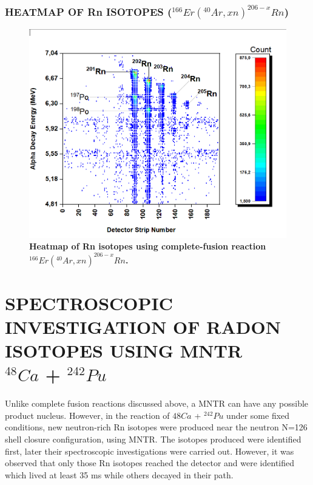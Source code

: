 \documentclass[12pt]{article}
\begin{document}
\subsubsection{HEATMAP OF Rn ISOTOPES ($^{166}Er(^{40}Ar,xn)^{206-x}Rn$)}
\begin{figure}[h]
\centering
\includegraphics[scale=0.5]{Heatmap_Rn(201-205).png}
\caption{\textbf{Heatmap of Rn isotopes using complete-fusion reaction $^{166}Er(^{40}Ar,xn)^{206-x}Rn$.}}
\label{Heatmap of Rn(201-205) isotopes.}
\end{figure}

\section{SPECTROSCOPIC INVESTIGATION OF RADON ISOTOPES USING MNTR\\ $^{48}Ca$ + $^{242}Pu$}
Unlike complete fusion reactions discussed above, a MNTR can have any possible product nucleus. However, in the reaction of ${48}Ca$ + $^{242}Pu$ under some fixed conditions, new neutron-rich Rn isotopes were produced near the neutron N=126 shell closure configuration, using MNTR. The isotopes produced were identified first, later their spectroscopic investigations were carried out. However, it was observed that only those Rn isotopes reached the detector and were identified which lived at least 35 ms while others decayed in their path. 

\clearpage
\end{document}
